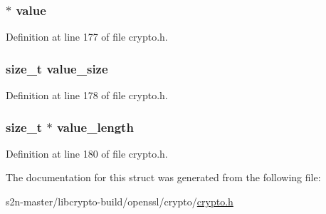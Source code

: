 \subsubsection[{\texorpdfstring{value}{value}}]{ $\ast$ value}\hypertarget{structopenssl__item__st_a7dccac59eba23582a5101033863db989}{}\label{structopenssl__item__st_a7dccac59eba23582a5101033863db989}


Definition at line 177 of file crypto.\+h.

\subsubsection[{\texorpdfstring{value\+\_\+size}{value_size}}]{\setlength{\rightskip}{0pt plus 5cm}size\+\_\+t value\+\_\+size}\hypertarget{structopenssl__item__st_a1f79f22363173f16bbbb89bbc3f93783}{}\label{structopenssl__item__st_a1f79f22363173f16bbbb89bbc3f93783}


Definition at line 178 of file crypto.\+h.

\subsubsection[{\texorpdfstring{value\+\_\+length}{value_length}}]{\setlength{\rightskip}{0pt plus 5cm}size\+\_\+t $\ast$ value\+\_\+length}\hypertarget{structopenssl__item__st_aff68878384a4ae3d8369da3fd1e6452b}{}\label{structopenssl__item__st_aff68878384a4ae3d8369da3fd1e6452b}


Definition at line 180 of file crypto.\+h.



The documentation for this struct was generated from the following file\+:\begin{DoxyCompactItemize}
\item 
s2n-\/master/libcrypto-\/build/openssl/crypto/\hyperlink{crypto_2crypto_8h}{crypto.\+h}\end{DoxyCompactItemize}
